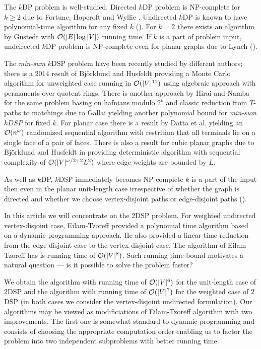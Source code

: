 The $k$DP problem is well-studied. Directed $k$DP problem is NP-complete for $k \geq 2$ due to Fortune, Hopcroft and Wyllie \cite{FHW}. Undirected $k$DP is known to have polynomial-time algorithm for any fixed $k$ (\cite{RS}). For $k = 2$ there exists an algorithm by Gustedt \cite{Gustedt} with $\mathcal{O}(|E| \log |V|)$ running time. If $k$ is a part of problem input, undeirected $k$DP problem is NP-complete even for planar graphs due to Lynch (\cite{Lynch}).

The \textit{min-sum} $k$DSP problem have been recently studied by different authors; there is a 2014 result of Björklund and Husfeldt \cite{BHICALP} providing a Monte Carlo algorithm for unweighted case running in $\mathcal{O}(|V|^{11})$ using algebraic approach with permanents over quotent rings. There is another approach by Hirai and Namba \cite{HN} for the same problem basing on hafnians modulo $2^k$ and classic reduction from $T$-paths to matchings due to Gallai \cite{Gallai} yielding another polynomial bound for \textit{min-sum} $kDSP$ for fixed $k$. For planar case there is a result by Datta et al. \cite{Datta} yielding an $\mathcal{O}(n^\omega)$ randomized sequential algorithm with restrition that all terminals lie on a single face of a pair of faces. There is also a result for cubic planar graphs due to Björklund and Husfeldt in \cite{BHPlanar} providing deterministic algorithm with sequential complexity of $\mathcal{O}(|V|^{\omega / 2 + 2} L^2)$ where edge weights are bounded by $L$. 

As well as $k$DP, $k$DSP immediately becomes NP-complete $k$ is a part of the input then even in the planar unit-length case irrespective of whether the graph is directed and whether we choose vertex-disjoint paths or edge-disjoint paths (\cite{ET}).

In this article we will concentrate on the 2DSP problem. For weighted undirected vertex-disjoint case, Eilam-Tzoreff provided a polynomial time algorithm based on a dynamic programming approach. He also provided a linear-time reduction from the edge-disjoint case to the vertex-disjoint case. The algorithm of Eilam-Tzoreff has is running time of $\mathcal{O}(|V|^8)$. Such running time bound motivates a natural question --- is it possible to solve the problem faster?

We obtain the algorithm with running time of $\mathcal{O}(|V|^6)$ for the unit-length case of $2$DSP and the algorithm with running time of $\mathcal{O}(|V|^7)$ for the weighted case of $2$DSP (in both cases we consider the vertex-disjoint undirected formulation). Our algorithms may be viewed as modificiations of Eilam-Tzoreff algorithm with two improvements. The first one is somewhat standard to dynamic programming and consists of choosing the appropriate computation order enabling us to factor the problem into two independent subproblems with better running time. 

